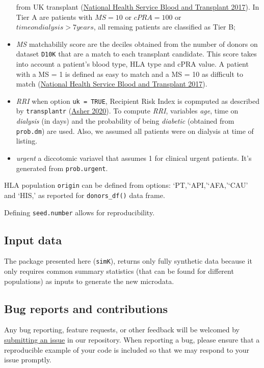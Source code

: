 \documentclass[
]{article}
\begin{document}
\begin{itemize}
  from UK transplant (\protect\hyperlink{ref-UK}{National Health Service
  Blood and Transplant 2017}). In Tier A are patients with \(MS = 10\)
  or \(cPRA = 100%
  \) or \(time on dialysis > 7 years\), all remaing patients are
  classified as Tier B;
\item
  \emph{MS} matchabilily score are the deciles obtained from the number
  of donors on dataset \texttt{D10K} that are a match to each transplant
  candidate. This score takes into account a patient's blood type, HLA
  type and cPRA value. A patient with a MS = 1 is defined as easy to
  match and a MS = 10 as difficult to match
  (\protect\hyperlink{ref-UK}{National Health Service Blood and
  Transplant 2017}).
\item
  \emph{RRI} when option \texttt{uk\ =\ TRUE}, Recipient Risk Index is
  copmputed as described by \texttt{transplantr}
  (\protect\hyperlink{ref-transplantr}{Asher 2020}). To compute
  \emph{RRI}, variables \emph{age}, time on \emph{dialysis} (in days)
  and the probability of being \emph{diabetic} (obtained from
  \texttt{prob.dm}) are used. Also, we assumed all patients were on
  dialysis at time of listing.
\item
  \emph{urgent} a diccotomic variavel that assumes 1 for clinical urgent
  patients. It's generated from \texttt{prob.urgent}.
\end{itemize}

HLA population \texttt{origin} can be defined from options:
`PT,'`API,'`AFA,'`CAU' and `HIS,' as reported for \texttt{donors\_df()}
data frame.

Defining \texttt{seed.number} allows for reproducibility.

\hypertarget{input-data}{%
\subsection{Input data}\label{input-data}}

The package presented here (\texttt{simK}), returns only fully synthetic
data because it only requires common summary statistics (that can be
found for different populations) as inputs to generate the new
microdata.

\hypertarget{bug-reports-and-contributions}{%
\subsection{Bug reports and
contributions}\label{bug-reports-and-contributions}}

Any bug reporting, feature requests, or other feedback will be welcomed
by \href{https://github.com/txopen/simK/issues}{submitting an issue} in
our repository. When reporting a bug, please ensure that a reproducible
example of your code is included so that we may respond to your issue
promptly.
\end{document}
